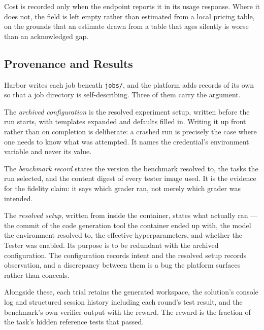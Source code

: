 Cost is recorded only when the endpoint reports it in its usage response. Where
it does not, the field is left empty rather than estimated from a local pricing
table, on the grounds that an estimate drawn from a table that ages silently is
worse than an acknowledged gap.


\subsection{Provenance and Results}

Harbor writes each job beneath \texttt{jobs/}, and the platform adds records of
its own so that a job directory is self-describing. Three of them carry the
argument.

The \emph{archived configuration} is the resolved experiment setup, written
before the run starts, with templates expanded and defaults filled in. Writing
it up front rather than on completion is deliberate: a crashed run is precisely
the case where one needs to know what was attempted. It names the credential's
environment variable and never its value.

The \emph{benchmark record} states the version the benchmark resolved to, the
tasks the run selected, and the content digest of every tester image used. It
is the evidence for the fidelity claim: it says which grader ran, not merely
which grader was intended.

The \emph{resolved setup}, written from inside the container, states what
actually ran --- the commit of the code generation tool the container ended up
with, the model the environment resolved to, the effective hyperparameters, and
whether the Tester was enabled. Its purpose is to be redundant with the
archived configuration. The configuration records intent and the resolved setup
records observation, and a discrepancy between them is a bug the platform
surfaces rather than conceals.

Alongside these, each trial retains the generated workspace, the solution's
console log and structured session history including each round's test result,
and the benchmark's own verifier output with the reward. The reward is the
fraction of the task's hidden reference tests that passed.

